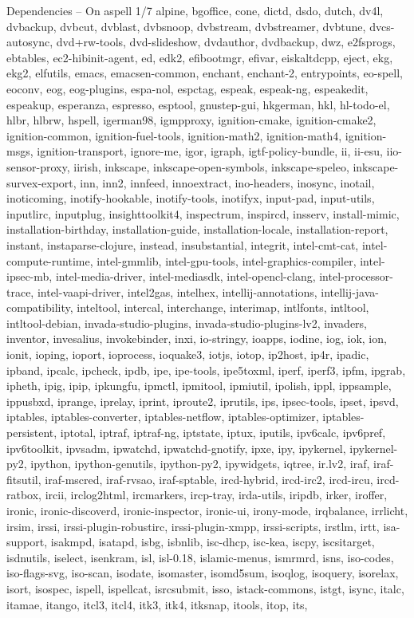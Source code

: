 \documentclass{beamer}
\begin{document}
\begin{frame}{Dependencies – On aspell 1/7}
\tiny alpine, bgoffice, cone, dictd, dsdo, dutch, dv4l, dvbackup, dvbcut, dvblast, dvbsnoop, dvbstream, dvbstreamer, dvbtune, dvcs-autosync, dvd+rw-tools, dvd-slideshow, dvdauthor, dvdbackup, dwz, e2fsprogs, ebtables, ec2-hibinit-agent, ed, edk2, efibootmgr, efivar, eiskaltdcpp, eject, ekg, ekg2, elfutils, emacs, emacsen-common, enchant, \alert{enchant-2}, entrypoints, eo-spell, eoconv, eog, eog-plugins, espa-nol, espctag, espeak, espeak-ng, espeakedit, espeakup, esperanza, espresso, esptool, gnustep-gui, hkgerman, hkl, hl-todo-el, hlbr, hlbrw, \alert{hspell}, igerman98, igmpproxy, ignition-cmake, ignition-cmake2, ignition-common, ignition-fuel-tools, ignition-math2, ignition-math4, ignition-msgs, ignition-transport, ignore-me, igor, igraph, igtf-policy-bundle, ii, ii-esu, iio-sensor-proxy, iirish, inkscape, inkscape-open-symbols, inkscape-speleo, inkscape-survex-export, inn, inn2, innfeed, innoextract, ino-headers, inosync, inotail, inoticoming, inotify-hookable, inotify-tools, inotifyx, input-pad, input-utils, inputlirc, inputplug, insighttoolkit4, inspectrum, inspircd, insserv, install-mimic, installation-birthday, installation-guide, installation-locale, installation-report, instant, instaparse-clojure, instead, insubstantial, integrit, intel-cmt-cat, intel-compute-runtime, intel-gmmlib, intel-gpu-tools, intel-graphics-compiler, intel-ipsec-mb, intel-media-driver, intel-mediasdk, intel-opencl-clang, intel-processor-trace, intel-vaapi-driver, intel2gas, intelhex, intellij-annotations, intellij-java-compatibility, inteltool, intercal, interchange, interimap, intlfonts, intltool, intltool-debian, invada-studio-plugins, invada-studio-plugins-lv2, invaders, inventor, invesalius, invokebinder, inxi, io-stringy, ioapps, iodine, iog, iok, ion, ionit, ioping, ioport, ioprocess, ioquake3, iotjs, iotop, ip2host, ip4r, ipadic, ipband, ipcalc, ipcheck, ipdb, ipe, ipe-tools, ipe5toxml, iperf, iperf3, ipfm, ipgrab, ipheth, ipig, ipip, ipkungfu, ipmctl, ipmitool, ipmiutil, ipolish, ippl, ippsample, ippusbxd, iprange, iprelay, iprint, iproute2, iprutils, ips, ipsec-tools, ipset, ipsvd, iptables, iptables-converter, iptables-netflow, iptables-optimizer, iptables-persistent, iptotal, iptraf, iptraf-ng, iptstate, iptux, iputils, ipv6calc, ipv6pref, ipv6toolkit, ipvsadm, ipwatchd, ipwatchd-gnotify, ipxe, ipy, ipykernel, ipykernel-py2, ipython, ipython-genutils, ipython-py2, ipywidgets, iqtree, ir.lv2, iraf, iraf-fitsutil, iraf-mscred, iraf-rvsao, iraf-sptable, ircd-hybrid, ircd-irc2, ircd-ircu, ircd-ratbox, ircii, irclog2html, ircmarkers, ircp-tray, irda-utils, iripdb, irker, iroffer, ironic, ironic-discoverd, ironic-inspector, ironic-ui, irony-mode, irqbalance, irrlicht, irsim, irssi, irssi-plugin-robustirc, irssi-plugin-xmpp, irssi-scripts, irstlm, irtt, isa-support, isakmpd, isatapd, isbg, isbnlib, isc-dhcp, isc-kea, iscpy, iscsitarget, isdnutils, iselect, isenkram, isl, isl-0.18, islamic-menus, ismrmrd, isns, iso-codes, iso-flags-svg, iso-scan, isodate, isomaster, isomd5sum, isoqlog, isoquery, isorelax, isort, isospec, \alert{ispell}, \alert{ispellcat}, isrcsubmit, isso, istack-commons, istgt, isync, italc, itamae, itango, itcl3, itcl4, itk3, itk4, itksnap, itools, itop, its, 
\end{frame}
\end{document}
